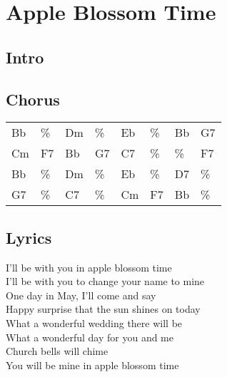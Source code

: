 \section{Apple Blossom Time}


\subsection*{Intro}


\subsection*{Chorus}


\begin{tabular}{l l l l l l l l}
Bb & \% & Dm & \% & Eb & \% & Bb & G7 \\ 
Cm & F7 & Bb & G7 & C7 & \% & \% & F7 \\ 
Bb & \% & Dm & \% & Eb & \% & D7 & \% \\ 
G7 & \% & C7 & \% & Cm & F7 & Bb & \% \\ 
\end{tabular}


\subsection*{Lyrics}


I'll be with you in apple blossom time \\ 
I'll be with you to change your name to mine \\ 
One day in May, I'll come and say \\ 
Happy surprise that the sun shines on today \\ 
What a wonderful wedding there will be \\ 
What a wonderful day for you and me \\ 
Church bells will chime \\ 
You will be mine in apple blossom time \\ 
